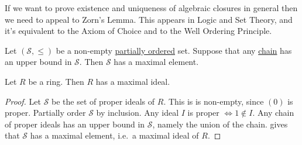 \documentclass{article}
\begin{document}
If we want to prove existence and uniqueness of algebraic closures in general then we need to appeal to Zorn's Lemma.
This appears in Logic and Set Theory, and it's equivalent to the Axiom of Choice and to the Well Ordering Principle.
\begin{nlemma}\label{lem:zorn}
    Let $(\mathcal{S},\leq)$ be a non-empty \hyperlink{def:poset}{partially ordered} set.
    Suppose that any \hyperlink{def:poset}{chain} has an upper bound in $\mathcal{S}$.
    Then $\mathcal{S}$ has a maximal element.
\end{nlemma}
\begin{nlemma}\label{lem:5.6}
    Let $R$ be a ring. Then $R$ has a maximal ideal.
\end{nlemma}
\begin{proof}
    Let $\mathcal{S}$ be the set of proper ideals of $R$.
    This is is non-empty, since $(0)$ is proper.
    Partially order $\mathcal{S}$ by inclusion.
    Any ideal $I$ is proper $\Longleftrightarrow 1 \notin I$.
    Any chain of proper ideals has an upper bound in $\mathcal{S}$, namely the union of the chain.
     gives that $\mathcal{S}$ has a maximal element, i.e.\ a maximal ideal of $R$.
\end{proof}
\end{document}
